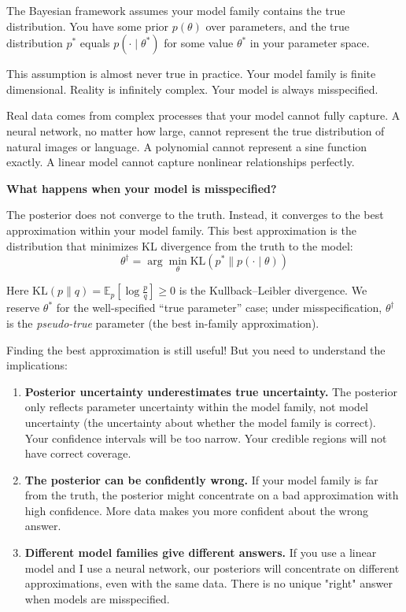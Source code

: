 The Bayesian framework assumes your model family contains the true distribution. You have some prior $p(\theta)$ over parameters, and the true distribution $p^*$ equals $p(\cdot \mid \theta^*)$ for some value $\theta^*$ in your parameter space.

This assumption is almost never true in practice. Your model family is finite dimensional. Reality is infinitely complex. Your model is always misspecified.

Real data comes from complex processes that your model cannot fully capture. A neural network, no matter how large, cannot represent the true distribution of natural images or language. A polynomial cannot represent a sine function exactly. A linear model cannot capture nonlinear relationships perfectly.

\textbf{What happens when your model is misspecified?}

The posterior does not converge to the truth. Instead, it converges to the best approximation within your model family. This best approximation is the distribution that minimizes KL divergence from the truth to the model:
\begin{equation}
\theta^\dagger = \arg\min_{\theta} \text{KL}(p^{*} \| p(\cdot \mid \theta))
\end{equation}

\noindent Here $\text{KL}(p\|q)=\mathbb{E}_{p}\!\left[\log\frac{p}{q}\right]\ge 0$ is the Kullback--Leibler divergence. We reserve $\theta^*$ for the well-specified ``true parameter'' case; under misspecification, $\theta^\dagger$ is the \emph{pseudo-true} parameter (the best in-family approximation).

Finding the best approximation is still useful! But you need to understand the implications:

\begin{enumerate}
\item \textbf{Posterior uncertainty underestimates true uncertainty.} The posterior only reflects parameter uncertainty within the model family, not model uncertainty (the uncertainty about whether the model family is correct). Your confidence intervals will be too narrow. Your credible regions will not have correct coverage.

\item \textbf{The posterior can be confidently wrong.} If your model family is far from the truth, the posterior might concentrate on a bad approximation with high confidence. More data makes you more confident about the wrong answer.

\item \textbf{Different model families give different answers.} If you use a linear model and I use a neural network, our posteriors will concentrate on different approximations, even with the same data. There is no unique "right" answer when models are misspecified.
\end{enumerate}

